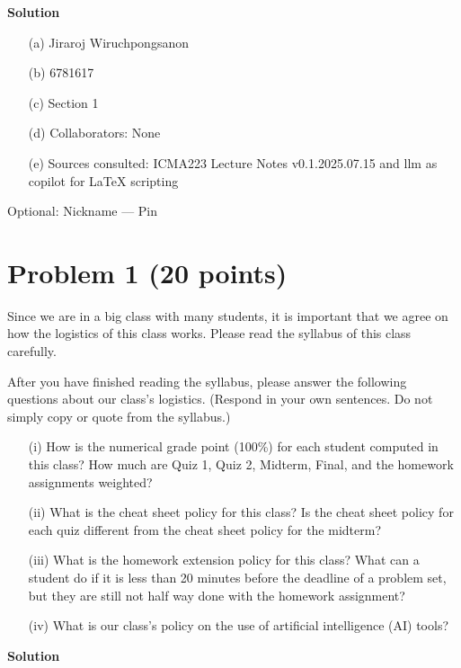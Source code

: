 \documentclass{article}
\newcommand{\solution}{\textbf{\large Solution}}
\theoremstyle{remark}
\begin{document}
\medskip
\solution

\begin{enumerate}
    \item[(a)] Jiraroj Wiruchpongsanon
    \item[(b)] 6781617
    \item[(c)] Section 1
    \item[(d)] Collaborators: None
    \item[(e)] Sources consulted: ICMA223 Lecture Notes v0.1.2025.07.15 and  llm as copilot for LaTeX scripting
\end{enumerate}

Optional: Nickname — Pin

\newpage

\section*{Problem 1 (20 points)}

Since we are in a big class with many students, it is important that we agree on how the logistics
of this class works. Please read the syllabus of this class carefully.

After you have finished reading the syllabus, please answer the following questions about our
class’s logistics. (Respond in your own sentences. Do not simply copy or quote from the syllabus.)
\begin{enumerate}
    \item[(i)] How is the numerical grade point (100\%) for each student computed in this class? How
    much are Quiz 1, Quiz 2, Midterm, Final, and the homework assignments weighted?
    \item[(ii)] What is the cheat sheet policy for this class? Is the cheat sheet policy for each quiz different
    from the cheat sheet policy for the midterm?
    \item[(iii)] What is the homework extension policy for this class? What can a student do if it is less
    than 20 minutes before the deadline of a problem set, but they are still not half way done
    with the homework assignment?
    \item[(iv)] What is our class’s policy on the use of artificial intelligence (AI) tools?
\end{enumerate}

\medskip
\solution
\end{document}

